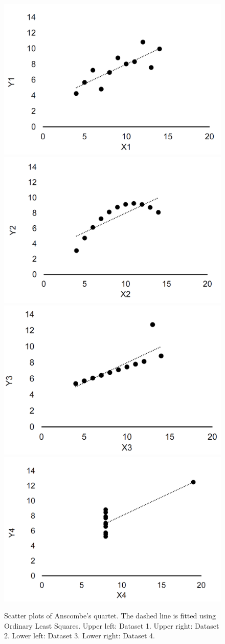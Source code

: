 \documentclass[]{book}
\begin{document}
\begin{figure}

{\centering \includegraphics[width=0.5\linewidth]{_resources/chapter_viz/ex1_1} \includegraphics[width=0.5\linewidth]{_resources/chapter_viz/ex1_2} \includegraphics[width=0.5\linewidth]{_resources/chapter_viz/ex1_3} \includegraphics[width=0.5\linewidth]{_resources/chapter_viz/ex1_4} 

}

\caption{Scatter plots of Anscombe's quartet. The dashed line is fitted using Ordinary Least Squares. Upper left: Dataset 1. Upper right: Dataset 2. Lower left: Dataset 3. Lower right: Dataset 4.}\label{fig:viz3}
\end{figure}
\end{document}
